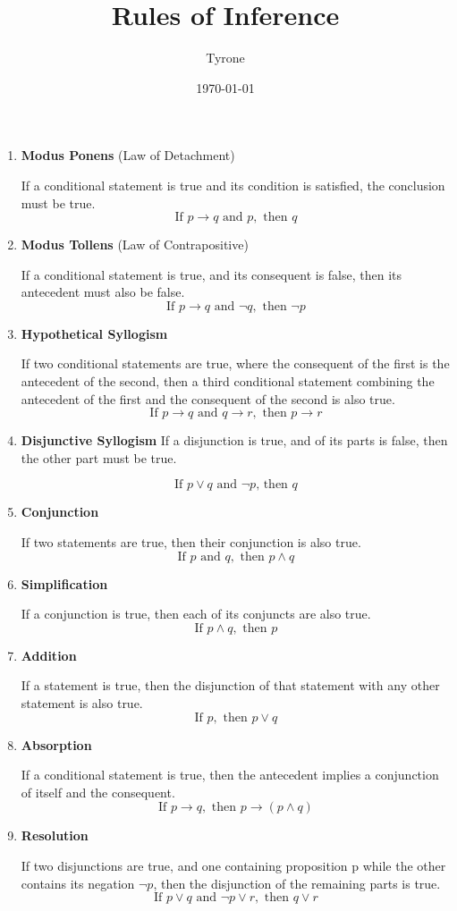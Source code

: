\documentclass[11pt]{article}
\author{Tyrone}
\date{\today}
\title{Rules of Inference}
\begin{document}
\maketitle
\begin{enumerate}
\item \textbf{Modus Ponens} (Law of Detachment)

If a conditional statement is true and its condition is satisfied, the conclusion must be true.
\[
   \text{If } p \rightarrow q \text{ and } p, \text{ then } q
   \]

\item \textbf{Modus Tollens} (Law of Contrapositive)

If a conditional statement is true, and its consequent is false, then its antecedent must also be false.
\[
   \text{If } p \rightarrow q \text{ and } \neg q, \text{ then } \neg p
   \]

\item \textbf{Hypothetical Syllogism}

If two conditional statements are true, where the consequent of the first is the antecedent of the second, then a third conditional statement combining the antecedent of the first and the consequent of the second is also true.
\[
   \text{If } p \rightarrow q \text{ and } q \rightarrow r, \text{ then } p \rightarrow r
   \]

\item \textbf{Disjunctive Syllogism}
If a disjunction is true, and of its parts is false, then the other part must be  true.

\[
   \text{If } p \lor q \text{ and } \neg p \text{, then } q
   \]

\item \textbf{Conjunction}

If two statements are true, then their conjunction is also true.
\[
   \text{If } p \text{ and } q, \text{ then } p \land q
   \]

\item \textbf{Simplification}

If a conjunction is true, then each of its conjuncts are also true.
\[
   \text{If } p \land q, \text{ then } p
   \]

\item \textbf{Addition}

If a statement is true, then the disjunction of that statement with any other statement is also true.
\[
   \text{If } p, \text{ then } p \lor q
   \]

\item \textbf{Absorption}

If a conditional statement is true, then the antecedent implies a conjunction of itself and the consequent.
\[
   \text{If } p \rightarrow q, \text{ then } p \rightarrow (p \land q)
   \]

\item \textbf{Resolution}

If two disjunctions are true, and one containing proposition p while the other contains its negation \(\neg p\), then the disjunction of the remaining parts is true.
\[
   \text{If } p \lor q \text{ and } \neg p \lor r, \text{ then } q \lor r
   \]
\end{enumerate}
\end{document}
